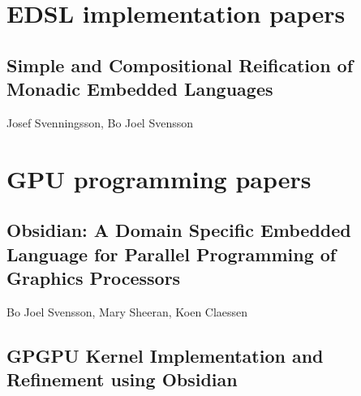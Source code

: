 \documentclass[a4paper]{book}
\newcommand{\paperBB}{Simple and Compositional Reification of Monadic Embedded Languages}
\newcommand{\paperIFL}{Obsidian: A Domain Specific Embedded Language for Parallel Programming of Graphics Processors}
\newcommand{\paperPAPP}{GPGPU Kernel Implementation and Refinement using Obsidian}
\begin{document}
\chapter{EDSL implementation papers}
\label{chap:EDSLImplementation}
% 
\cleardoublepage 


\section{\paperBB}
\label{sec:paperBB}

\begin{center} 
Josef Svenningsson, Bo Joel Svensson
\end{center}






\chapter{GPU programming papers}
\label{chap:GPUProgramming}

% 
\cleardoublepage 

\section{\paperIFL}
\label{sec:paperIFL}

\begin{center} 
Bo Joel Svensson, Mary Sheeran, Koen Claessen
\end{center}



% 
\cleardoublepage 

\section{\paperPAPP}
\label{sec:paperPAPP}
\end{document}
